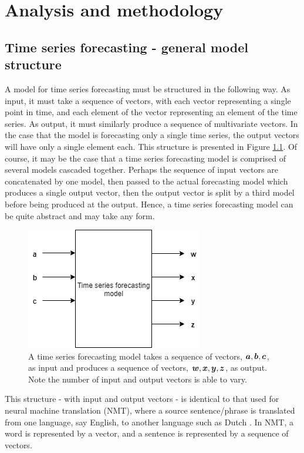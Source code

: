 \chapter{Analysis and methodology}

\section{Time series forecasting - general model structure}
A model for time series forecasting must be structured in the following way.
As input, it must take a sequence of vectors, with each vector representing a single point in time, and each element of the vector representing an element of the time series.
As output, it must similarly produce a sequence of multivariate vectors.
In the case that the model is forecasting only a single time series, the output vectors will have only a single element each.
This structure is presented in Figure \ref{fig:forecast-model}.
Of course, it may be the case that a time series forecasting model is comprised of several models cascaded together.
Perhaps the sequence of input vectors are concatenated by one model, then passed to the actual forecasting model which produces a single output vector, then the output vector is split by a third model before being produced at the output.
Hence, a time series forecasting model can be quite abstract and may take any form.

\begin{figure}
	\centering
	\includegraphics[width=0.35\linewidth]{images/forecast-model}
	\caption{A time series forecasting model takes a sequence of vectors, ${\bm{a}}, {\bm{b}}, {\bm{c}}$, as input and produces a sequence of vectors, ${\bm{w}}, {\bm{x}}, {\bm{y}}, {\bm{z}}$, as output. Note the number of input and output vectors is able to vary.}
	\label{fig:forecast-model}
\end{figure}

This structure - with input and output vectors - is identical to that used for neural machine translation (NMT), where a source sentence/phrase is translated from one language, say English, to another language such as Dutch \citep{Cho2014}.
In NMT, a word is represented by a vector, and a sentence is represented by a sequence of vectors.

